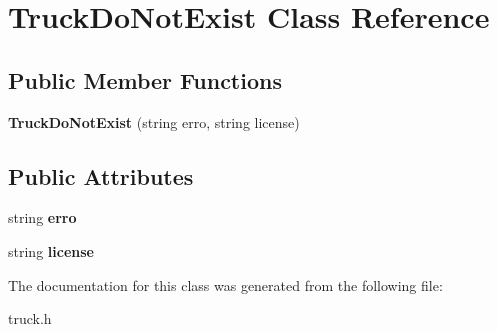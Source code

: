 \hypertarget{class_truck_do_not_exist}{}\section{Truck\+Do\+Not\+Exist Class Reference}
\label{class_truck_do_not_exist}
\subsection*{Public Member Functions}
\begin{DoxyCompactItemize}
\item 
\mbox{\label{class_truck_do_not_exist_a3ddb801af2c414865341da459bec4764}} 
{\bfseries Truck\+Do\+Not\+Exist} (string erro, string license)
\end{DoxyCompactItemize}
\subsection*{Public Attributes}
\begin{DoxyCompactItemize}
\item 
\mbox{\label{class_truck_do_not_exist_aa5c4170dfadd89e2681abe4232f5bed5}} 
string {\bfseries erro}
\item 
\mbox{\label{class_truck_do_not_exist_aa84f15b36bb887ac897b76479fd385d3}} 
string {\bfseries license}
\end{DoxyCompactItemize}


The documentation for this class was generated from the following file\+:\begin{DoxyCompactItemize}
\item 
truck.\+h\end{DoxyCompactItemize}
